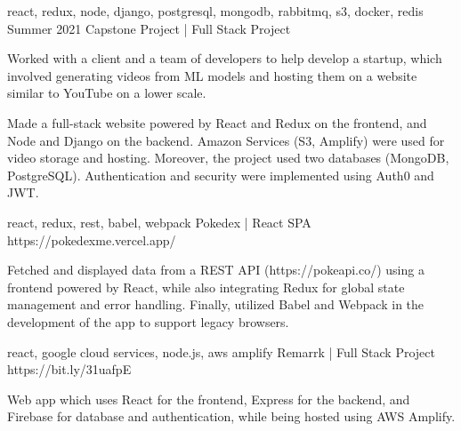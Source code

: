 


\begin{cventries}



\vspace{-1.0mm}
  \cventry
    {react, redux, node, django, postgresql, mongodb, rabbitmq, s3, docker, redis } %
    {Summer 2021 Capstone Project | Full Stack Project}  %
    {} %
    {} 
    {
      \begin{cvitems} %
        \item {Worked with a client and a team of developers to help develop a startup, which involved generating videos from ML models and hosting them on a website similar to YouTube on a lower scale.}
        \item {Made a full-stack website powered by React and Redux on the frontend, and Node and Django on the backend. Amazon Services (S3, Amplify) were used for video storage and hosting. Moreover, the project used two databases (MongoDB, PostgreSQL). Authentication and security were implemented using Auth0 and JWT.}   
      \end{cvitems}
    }

\vspace{-1.0mm}
  \cventry
    {react, redux, rest, babel, webpack} %
    {Pokedex | React SPA}  %
    {https://pokedexme.vercel.app/} %
    {} 
    {
      \begin{cvitems} %
        \item {Fetched and displayed data from a REST API (https://pokeapi.co/) using a frontend powered by React, while also integrating Redux for global state management and error handling. Finally, utilized Babel and Webpack in the development of the app to support legacy browsers.} 
      \end{cvitems}
    }

\vspace{-1.0mm}
  \cventry
    {react, google cloud services, node.js, aws amplify} %
    {Remarrk | Full Stack Project}  %
    {https://bit.ly/31uafpE} %
    {} 
    {
      \begin{cvitems} %
        \item {Web app which uses React for the frontend, Express for the backend, and Firebase for database and authentication, while being hosted using AWS Amplify.} 
      \end{cvitems}
    }


\end{cventries}
